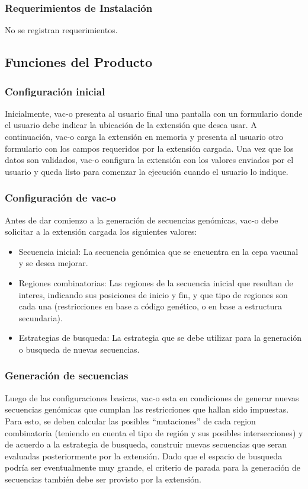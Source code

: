 \documentclass[10pt,a4paper]{article}
\begin{document}
    \subsubsection{Requerimientos de Instalaci\'on}
    No se registran requerimientos.

  \subsection{Funciones del Producto}
  
  \subsubsection{Configuraci\'on inicial}
  Inicialmente, vac-o presenta al usuario final una pantalla con un formulario donde el usuario debe indicar la ubicaci\'on de la extensi\'on que desea usar. A continuaci\'on, vac-o carga la extensi\'on en memoria y presenta al usuario otro formulario con los campos requeridos por la extensi\'on cargada.
  Una vez que los datos son validados, vac-o configura la extensi\'on con los valores enviados por el usuario y queda listo para comenzar la ejecuci\'on cuando el usuario lo indique.

  \subsubsection{Configuraci\'on de vac-o}
  Antes de dar comienzo a la generaci\'on de secuencias gen\'omicas, vac-o debe solicitar a la extensi\'on cargada los siguientes valores:
  \begin{itemize}
    \item Secuencia inicial: La secuencia gen\'omica que se encuentra en la cepa vacunal y se desea mejorar.
    \item Regiones combinatorias: Las regiones de la secuencia inicial que resultan de interes, indicando sus posiciones de inicio y fin, y que tipo de regiones son cada una (restricciones en base a c\'odigo gen\'etico, o en base a estructura secundaria).
    \item Estrategias de busqueda: La estrategia que se debe utilizar para la generaci\'on o busqueda de nuevas secuencias.
  \end{itemize}
  
  \subsubsection{Generaci\'on de secuencias}
  Luego de las configuraciones basicas, vac-o esta en condiciones de generar nuevas secuencias gen\'omicas que cumplan las restricciones que hallan sido impuestas. Para esto, se deben calcular las posibles ``mutaciones'' de cada region combinatoria (teniendo en cuenta el tipo de regi\'on y sus posibles intersecciones) y de acuerdo a la estrategia de busqueda, construir nuevas secuencias que seran evaluadas posteriormente por la extensi\'on. Dado que el espacio de busqueda podr\'ia ser eventualmente muy grande, el criterio de parada para la generaci\'on de secuencias tambi\'en debe ser provisto por la extensi\'on.
\end{document}
